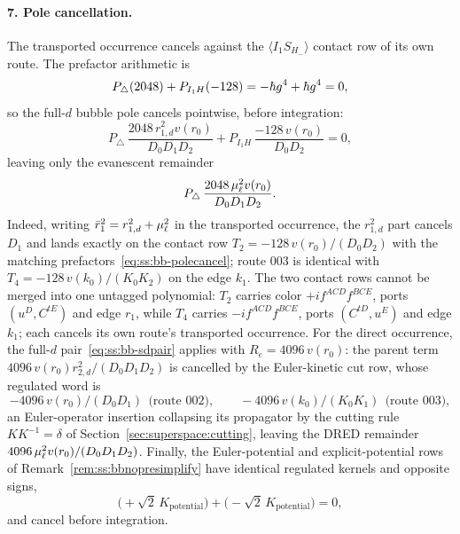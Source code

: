 \paragraph{7. Pole cancellation.} The transported occurrence cancels against
the $\langle I_1S_{H_-}\rangle$ contact row of its own route. The prefactor
arithmetic is
\begin{equation}\label{eq:ss:bb-polecancel}
P_\triangle(2048)+P_{I_1H}(-128)=-\hbar g^{4}+\hbar g^{4}=0,
\end{equation}
so the full-$d$ bubble pole cancels pointwise, before integration:
\begin{equation}\label{eq:ss:bb-pointwise}
P_\triangle\,\frac{2048\,r_{1,d}^{2}v(r_0)}{D_0D_1D_2}
+P_{I_1H}\,\frac{-128\,v(r_0)}{D_0D_2}=0,
\end{equation}
leaving only the evanescent remainder
\begin{equation}\label{eq:ss:bb-tremainder}
P_\triangle\,\frac{2048\,\mu_\ell^{2}v(r_0)}{D_0D_1D_2}.
\end{equation}
Indeed, writing $\bar r_1^{2}=r_{1,d}^{2}+\mu_\ell^{2}$ in the transported
occurrence, the $r_{1,d}^{2}$ part cancels $D_1$ and lands exactly on the
contact row $T_2=-128\,v(r_0)/(D_0D_2)$ with the matching
prefactors~\eqref{eq:ss:bb-polecancel}; route 003 is identical with
$T_4=-128\,v(k_0)/(K_0K_2)$ on the edge $k_1$. The two contact rows cannot be
merged into one untagged polynomial: $T_2$ carries color $+if^{ACD}f^{BCE}$,
ports $(u^D,C^{tE})$ and edge $r_1$, while $T_4$ carries $-if^{ACD}f^{BCE}$,
ports $(C^{tD},u^E)$ and edge $k_1$; each cancels its own route's transported
occurrence. For the direct occurrence, the full-$d$ pair~\eqref{eq:ss:bb-sdpair}
applies with $R_e=4096\,v(r_0)$: the parent term
$4096\,v(r_0)r_{2,d}^{2}/(D_0D_1D_2)$ is cancelled by the Euler-kinetic cut
row, whose regulated word is
\begin{equation}\label{eq:ss:bb-eulercut}
-4096\,v(r_0)/(D_0D_1)\ \ \text{(route 002)},
\qquad
-4096\,v(k_0)/(K_0K_1)\ \ \text{(route 003)},
\end{equation}
an Euler-operator insertion collapsing its propagator by the cutting rule
$KK^{-1}=\delta$ of Section~\ref{sec:superspace:cutting}, leaving the DRED
remainder $4096\,\mu_\ell^{2}v(r_0)/(D_0D_1D_2)$. Finally, the Euler-potential and
explicit-potential rows of Remark~\ref{rem:ss:bbnopresimplify} have identical
regulated kernels and opposite signs,
\begin{equation}\label{eq:ss:bb-potcancel}
\big(+\sqrt2\,K_{\mathrm{potential}}\big)+\big(-\sqrt2\,K_{\mathrm{potential}}\big)=0,
\end{equation}
and cancel before integration.

